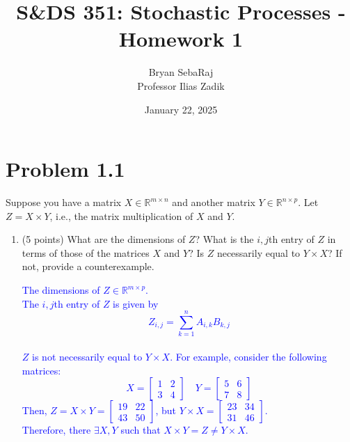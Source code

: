 \documentclass{article}
\title{S\&DS 351: Stochastic Processes - Homework 1}
\author{Bryan SebaRaj \\[0.8em] Professor Ilias Zadik}
\date{January 22, 2025}
\begin{document}
\maketitle

\section*{Problem 1.1}
Suppose you have a matrix $X \in \mathbb{R}^{m \times n}$ and another matrix $Y \in \mathbb{R}^{n \times p}$. Let $Z = X \times Y$, i.e., the matrix multiplication of $X$ and $Y$.

\begin{enumerate}[label=(\alph*)]
    \item (5 points) What are the dimensions of $Z$? What is the $i,j$th entry of $Z$ in terms of those of the matrices $X$ and $Y$? Is $Z$ necessarily equal to $Y \times X$? If not, provide a counterexample.

        \textcolor{blue}{The dimensions of $Z \in \mathbb{R}^{m \times p}$. \\ The $i,j$th entry of $Z$ is given by 
        $$Z_{i,j}=\sum_{k=1}^{n}A_{i,k}B_{k,j}$$ \\ 
         $Z$ is not necessarily equal to $Y \times X$. For example, consider the following matrices:
         $$X = \begin{bmatrix} 1 & 2 \\ 3 & 4 \end{bmatrix} \quad Y = \begin{bmatrix} 5 & 6 \\ 7 & 8 \end{bmatrix}$$
         Then, $Z = X \times Y = \begin{bmatrix} 19 & 22 \\ 43 & 50 \end{bmatrix}$, but $Y \times X = \begin{bmatrix} 23 & 34 \\ 31 & 46 \end{bmatrix}$.
     \\[0.6em] Therefore, there $\exists X, Y$ such that $X \times Y = Z \neq Y \times X$.}
    

\end{enumerate}
\end{document}

